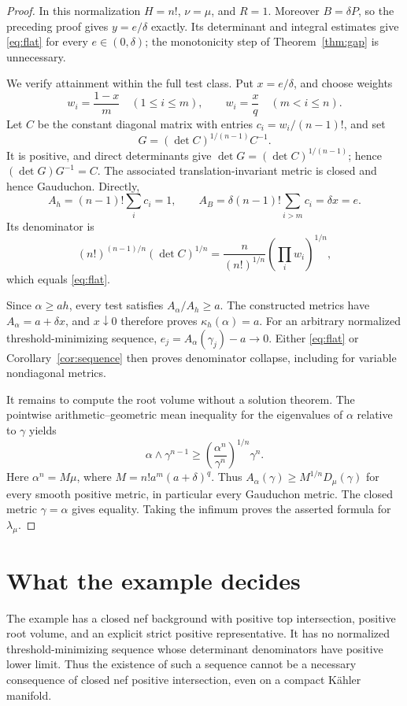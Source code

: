 \documentclass[11pt]{article}
\begin{document}
\begin{proof}
In this normalization \(H=n!\), \(\nu=\mu\), and \(R=1\).
Moreover \(B=\delta P\), so the preceding proof gives
\(y=e/\delta\) exactly. Its determinant and integral estimates give
\eqref{eq:flat} for every \(e\in(0,\delta)\); the monotonicity step of
Theorem~\ref{thm:gap} is unnecessary.

We verify attainment within the full test class. Put \(x=e/\delta\), and
choose weights
\[
 w_i=\frac{1-x}{m}\quad(1\leq i\leq m),\qquad
 w_i=\frac{x}{q}\quad(m<i\leq n).
\]
Let \(C\) be the constant diagonal matrix with entries
\(c_i=w_i/(n-1)!\), and set
\[
 G=(\det C)^{1/(n-1)}C^{-1}.
\]
It is positive, and direct determinants give
\(\det G=(\det C)^{1/(n-1)}\); hence \((\det G)G^{-1}=C\).
The associated translation-invariant metric is closed and hence
Gauduchon. Directly,
\[
 A_h=(n-1)!\sum_i c_i=1,\qquad
 A_B=\delta(n-1)!\sum_{i>m}c_i=\delta x=e.
\]
Its denominator is
\[
 (n!)^{(n-1)/n}(\det C)^{1/n}
 =\frac{n}{(n!)^{1/n}}\left(\prod_i w_i\right)^{1/n},
\]
which equals \eqref{eq:flat}.

Since \(\alpha\geq a h\), every test satisfies \(A_\alpha/A_h\geq a\).
The constructed metrics have \(A_\alpha=a+\delta x\), and \(x\downarrow0\)
therefore proves \(\kappa_h(\alpha)=a\).
For an arbitrary normalized threshold-minimizing sequence,
\(e_j=A_\alpha(\gamma_j)-a\to0\).
Either \eqref{eq:flat} or Corollary~\ref{cor:sequence} then proves
denominator collapse, including for variable nondiagonal metrics.

It remains to compute the root volume without a solution theorem.
The pointwise arithmetic--geometric mean inequality for the eigenvalues
of \(\alpha\) relative to \(\gamma\) yields
\[
 \alpha\wedge\gamma^{n-1}
 \geq
 \left(\frac{\alpha^n}{\gamma^n}\right)^{1/n}\gamma^n.
\]
Here \(\alpha^n=M\mu\), where \(M=n!a^m(a+\delta)^q\).
Thus \(A_\alpha(\gamma)\geq M^{1/n}D_\mu(\gamma)\) for every smooth
positive metric, in particular every Gauduchon metric.
The closed metric \(\gamma=\alpha\) gives equality. Taking the infimum
proves the asserted formula for \(\lambda_\mu\).
\end{proof}

\section{What the example decides}

The example has a closed nef background with positive top intersection,
positive root volume, and an explicit strict positive representative.
It has no normalized threshold-minimizing sequence whose determinant
denominators have positive lower limit. Thus the existence of such
a sequence cannot be a necessary consequence of closed nef positive
intersection, even on a compact K\"ahler manifold.
\end{document}
